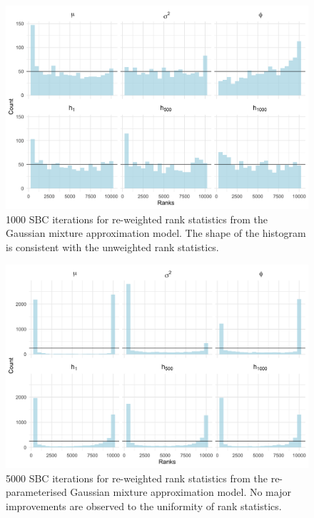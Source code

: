 \documentclass[12pt, a4paper]{article}
\begin{document}
\begin{figure}[H]
        \centering
        \includegraphics[scale=0.1]{results/weighted_ksc_cp_1k.png}
        \caption{1000 SBC iterations for re-weighted rank statistics from the Gaussian mixture approximation model. The shape of the histogram is consistent with the unweighted rank statistics.}
        \label{fig:reweight1k}
    \end{figure}

\begin{figure}[H]
    \centering
    \includegraphics[scale=0.09]{results/weighted_ksc_ncp_5k.png}
    \caption{5000 SBC iterations for re-weighted rank statistics from the re-parameterised Gaussian mixture approximation model. No major improvements are observed to the uniformity of rank statistics.}
    \label{fig:ncpreweight5k}
\end{figure}
\end{document}
